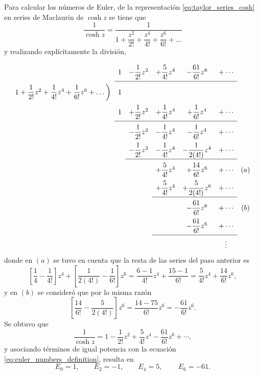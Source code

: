 \documentclass[a4paper]{report}
\begin{document}
Para calcular los números de Euler, de la representación \ref{eq:taylor_series_cosh} en series de Maclaurin de \(\cosh z\) se tiene que 
\[
 \frac{1}{\cosh z}=\dfrac{1}{1+\dfrac{z^2}{2!}+\dfrac{z^4}{4!}+\dfrac{z^6}{6!}+\dots}
\]
y realizando explícitamente la división,
\[
\setlength\extrarowheight{10pt}
\begin{array}[t]{ccccccc}
                       & 1  & -\dfrac{1}{2!}z^2 & +\dfrac{5}{4!}z^4 & -\dfrac{61}{6!}z^6 & +\cdots&\\[\medskipamount]
\cline{2-6}
1+\dfrac{1}{2!}z^2+\dfrac{1}{4!}z^4+\dfrac{1}{6!}z^6+\dots\bigg)  
                       & 1  & &  &  &  &\\
                       & 1  & +\dfrac{1}{2!}z^2 & +\dfrac{1}{4!}z^4 & +\dfrac{1}{6!}z^4 & +\cdots&\\[\medskipamount]
\cline{2-6}
                       &    & -\dfrac{1}{2!}z^2 & -\dfrac{1}{4!}z^4 & -\dfrac{1}{6!}z^4 & +\cdots&\\
                       &    & -\dfrac{1}{2!}z^2 & -\dfrac{1}{4!}z^4 & -\dfrac{1}{2(4!)}z^4 & +\cdots&\\[\medskipamount]
\cline{3-6}
                       &    &                & +\dfrac{5}{4!}z^4 & +\dfrac{14}{6!}z^6 & +\cdots&(a)\\
                       &    &                & +\dfrac{5}{4!}z^4 & +\dfrac{5}{2(4!)}z^6 & +\cdots&\\[\medskipamount]
\cline{4-6}
                       &    &                &                   & -\dfrac{61}{6!}z^6 & +\cdots&(b)\\
                       &    &                &                   & -\dfrac{61}{6!}z^6 & +\cdots&\\[\medskipamount]
\cline{4-6}
                       &    &                &                   &  & \vdots&
\end{array}
\]
donde en \((a)\) se tuvo en cuenta que la resta de las series del paso anterior es
\[
 \left[\frac{1}{4}-\frac{1}{4!}\right]z^4+\left[\frac{1}{2(4!)}-\frac{1}{6!}\right]z^6=
 \frac{6-1}{4!}z^4+\frac{15-1}{6!}=\dfrac{5}{4!}z^4+\dfrac{14}{6!}z^6, 
\]
y en \((b)\) se consideró que por lo misma razón 
\[
 \left[\frac{14}{6!}-\frac{5}{2(4!)}\right]z^6=\frac{14-75}{6!}z^6=-\frac{61}{6!}z^6.
\]
Se obtuvo que 
\[
 \frac{1}{\cosh z}=1-\frac{1}{2!}z^2+\dfrac{5}{4!}z^4-\dfrac{61}{6!}z^6+\cdots,
\]
y asociando términos de igual potencia con la ecuación \ref{eq:euler_numbers_definition}, resulta en
\[
 E_0=1,\qquad 
 E_2=-1,\qquad 
 E_4=5,\,\qquad 
 E_6=-61.
\]









































\end{document}
